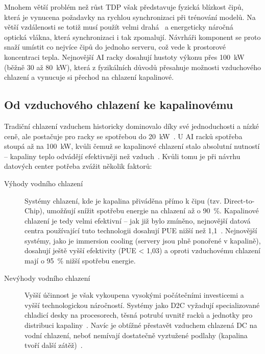 Mnohem větší problém než růst TDP však představuje fyzická blízkost čipů, která je vynucena požadavky na rychlou synchronizaci při trénování modelů. Na větší vzdálenosti se totiž musí použít velmi drahá~\cite[s.~4]{avelar_ai_2023} a energeticky náročná~\cite[s.~36]{cruzes_data_2025} optická vlákna, která synchronizaci i tak zpomalují. Návrháři komponent se proto snaží umístit co nejvíce čipů do jednoho serveru, což vede k prostorové koncentraci tepla. Nejnovější AI racky dosahují hustoty výkonu přes 100~kW (běžně 30 až 80~kW), která z fyzikálních důvodů přesahuje možnosti vzduchového chlazení a vynucuje si přechod na chlazení kapalinové.~\cite[s.~23]{cruzes_data_2025}

\subsection{Od vzduchového chlazení ke kapalinovému}
\label{subsec:vzduch}

Tradiční chlazení vzduchem historicky dominovalo díky své jednoduchosti a nízké ceně, ale postačuje pro racky se spotřebou do 20~kW~\cite[s.~10]{avelar_ai_2023}. U AI racků spotřeba stoupá až na 100~kW, kvůli čemuž se kapalinové chlazení stalo absolutní nutností -- kapaliny teplo odvádějí efektivněji než vzduch~\cite[s.~4]{chen_electricity_2025}. Kvůli tomu je při návrhu datových center potřeba zvážit několik faktorů:

\begin{description}
    \item[Výhody vodního chlazení] Systémy chlazení, kde je kapalina přiváděna pří\-mo k čipu (tzv. Direct-to-Chip), umožňují snížit spotřebu energie na chlazení až o 90~\%. Kapalinové chlazení je tedy velmi efektivní -- jak již bylo zmíněno, nejnovější datová centra používající tuto technologii dosahují PUE nižší než 1,1~\cite{sheng_power_2026, chen_electricity_2025}. Nejnovější systémy, jako je immersion cooling (servery jsou plně ponořené v kapalině), dosahují ještě vyšší efektivity (PUE < 1,03) a oproti vzduchovému chlazení mají o 95~\% nižší spotřebu energie.~\cite[s.~17--19]{cruzes_data_2025}
    \item[Nevýhody vodního chlazení] Vyšší účinnost je však vykoupena vysokými počátečními investicemi a vyšší technologickou náročností. Systémy jako D2C vyžadují specializované chladicí desky na procesorech, těsná potrubí uvnitř racků a jednotky pro distribuci kapaliny~\cite[s.~18]{cruzes_data_2025}. Navíc je obtížné přestavět vzduchem chlazená DC na vodní chlazení, neboť nemívají dostatečně vyztužené podlahy (kapalina tvoří další zátěž)~\cite[s.~11]{avelar_ai_2023}.
\end{description}

